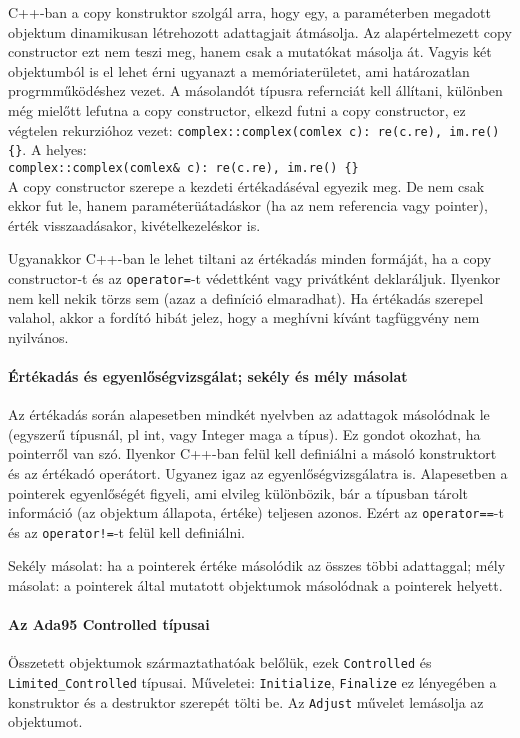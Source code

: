 \documentclass[fleqn,10pt,a4paper]{article}
\newcommand{\ut}[1]{\texttt{#1}}
\theoremstyle{magyar}
\begin{document}
  C++-ban a copy konstruktor szolgál arra, hogy egy, a paraméterben
  megadott objektum dinamikusan létrehozott adattagjait átmásolja. Az
  alapértelmezett copy constructor ezt nem teszi meg, hanem csak a
  mutatókat másolja át. Vagyis két objektumból is el lehet érni
  ugyanazt a memóriaterületet, ami határozatlan progrmműködéshez
  vezet. A másolandót típusra refernciát kell állítani, különben még
  mielőtt lefutna a copy constructor, elkezd futni a copy constructor,
  ez végtelen rekurzióhoz vezet: \ut{complex::complex(comlex c):
  re(c.re), im.re() \{\}}. A helyes:\\
  \ut{complex::complex(comlex\& c): re(c.re), im.re() \{\}}\\
  
  A copy constructor szerepe a kezdeti értékadáséval egyezik meg. De
  nem csak ekkor fut le, hanem paraméterüátadáskor (ha az nem
  referencia vagy pointer), érték visszaadásakor, kivételkezeléskor is.
  
  Ugyanakkor C++-ban le lehet tiltani az értékadás minden formáját, ha
  a copy constructor-t és az \ut{operator=}-t védettként vagy
  privátként deklaráljuk. Ilyenkor nem kell nekik törzs sem (azaz a
  definíció elmaradhat). Ha értékadás szerepel valahol, akkor a
  fordító hibát jelez, hogy a meghívni kívánt tagfüggvény nem nyilvános.

  \paragraph{Értékadás és egyenlőségvizsgálat; sekély és mély másolat}
  Az értékadás során alapesetben mindkét nyelvben az adattagok
  másolódnak le (egyszerű típusnál, pl int, vagy Integer maga a
  típus). Ez gondot okozhat, ha pointerről van szó. Ilyenkor C++-ban
  felül kell definiálni a másoló konstruktort és az értékadó
  operátort.
  Ugyanez igaz az egyenlőségvizsgálatra is. Alapesetben a pointerek
  egyenlőségét figyeli, ami elvileg különbözik, bár a típusban tárolt
  információ (az objektum állapota, értéke) teljesen azonos. Ezért az
  \ut{operator==}-t és az \ut{operator!=}-t felül kell definiálni.
  
  Sekély másolat: ha a pointerek értéke másolódik az összes többi
  adattaggal; mély másolat: a pointerek által mutatott objektumok
  másolódnak a pointerek helyett.
  
  \paragraph{Az Ada95 Controlled típusai}
  Összetett objektumok származtathatóak belőlük, ezek  \ut{Controlled}
  és \ut{Limited\_Controlled} típusai. Műveletei: \ut{Initialize},
  \ut{Finalize} ez lényegében a konstruktor és a destruktor szerepét
  tölti be. Az \ut{Adjust} művelet lemásolja az objektumot.
\end{document}
